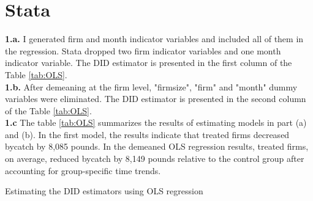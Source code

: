 \documentclass{article}
\begin{document}
\section{Stata}

\noindent \textbf{1.a.} I generated firm and month indicator variables and included all of them in the regression. Stata dropped two firm indicator variables and one month indicator variable. The DID estimator is presented in the first column of the Table \ref{tab:OLS}. \\

\noindent \textbf{1.b.} After demeaning at the firm level, "firmsize", "firm" and "month" dummy variables were eliminated. The DID estimator is presented in the second column of the Table \ref{tab:OLS}. \\

\noindent \textbf{1.c} The table \ref{tab:OLS} summarizes the results of estimating models in part (a) and (b). In the first model, the results indicate that treated firms decreased bycatch by 8,085 pounds. In the demeaned OLS regression results, treated firms, on average, reduced bycatch by 8,149 pounds relative to the control group after accounting for group-specific time trends.

\begin{table}[]
    \centering
    
    \caption{Estimating the DID estimators using OLS regression}
    \label{tab:OLS}
\end{table}
\end{document}
